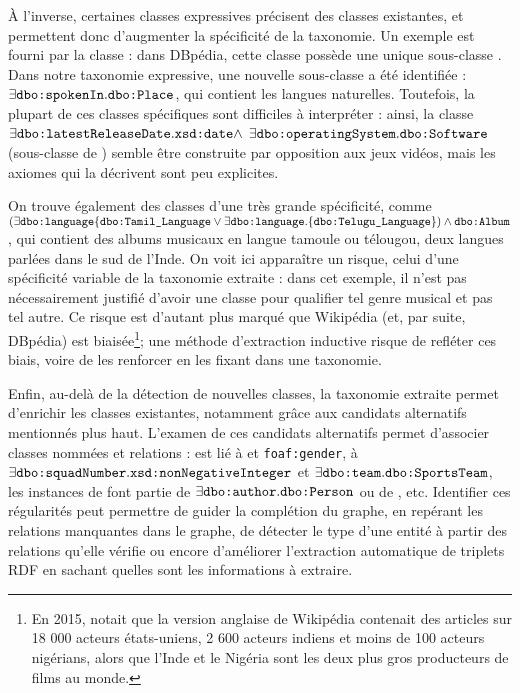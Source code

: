 À l'inverse, certaines classes expressives précisent des classes existantes, et permettent donc d'augmenter la spécificité de la taxonomie. Un exemple est fourni par la classe  : dans DBpédia, cette classe possède une unique sous-classe . Dans notre taxonomie expressive, une nouvelle sous-classe a été identifiée : $\exists \texttt{dbo:spokenIn}.\texttt{dbo:Place}$, qui contient les langues naturelles.
%
Toutefois, la plupart de ces classes spécifiques sont difficiles à interpréter : ainsi, la classe $\exists \texttt{dbo:latestReleaseDate}.\texttt{xsd:date} \land$ $\exists \texttt{dbo:operatingSystem} \allowbreak .\texttt{dbo:Software}$ (sous-classe de ) semble être construite par opposition aux jeux vidéos, mais les axiomes qui la décrivent sont peu explicites.
%

On trouve également des classes d'une très grande spécificité, comme $(\exists \texttt{dbo:language} \{ \texttt{dbo:Tamil\_Language} \lor \exists \texttt{dbo:language}.\{ \texttt{dbo:Telugu\_Language} \}) \land \texttt{dbo:Album}$, qui contient des albums musicaux en langue tamoule ou télougou, deux langues parlées dans le sud de l'Inde. On voit ici apparaître un risque, celui d'une spécificité variable de la taxonomie extraite : dans cet exemple, il n'est pas nécessairement justifié d'avoir une classe pour qualifier tel genre musical et pas tel autre. 
Ce risque est d'autant plus marqué que Wikipédia (et, par suite, DBpédia) est biaisée\footnote{En 2015, \cite{nickel2015review} notait que la version anglaise de Wikipédia contenait des articles sur 18 000 acteurs états-uniens, 2 600 acteurs indiens et moins de 100 acteurs nigérians, alors que l'Inde et le Nigéria sont les deux plus gros producteurs de films au monde.}; une méthode d'extraction inductive risque de refléter ces biais, voire de les renforcer en les fixant dans une taxonomie.

Enfin, au-delà de la détection de nouvelles classes, la taxonomie extraite permet d'enrichir les classes existantes, notamment grâce aux candidats alternatifs mentionnés plus haut. L'examen de ces candidats alternatifs permet d'associer classes nommées et relations :  est lié à  et \texttt{foaf:gender},  à $\exists \texttt{dbo:squadNumber}.\allowbreak \texttt{xsd:nonNegativeInteger}$ et $\exists \texttt{dbo:team}. \allowbreak \texttt{dbo:SportsTeam}$, les instances de  font partie de $\exists \texttt{dbo:author}. \allowbreak \texttt{dbo:Person}$ ou de , etc.
Identifier ces régularités peut permettre de guider la complétion du graphe, en repérant les relations manquantes dans le graphe, de détecter le type d'une entité à partir des relations qu'elle vérifie ou encore d'améliorer l'extraction automatique de triplets RDF en sachant quelles sont les informations à extraire.



